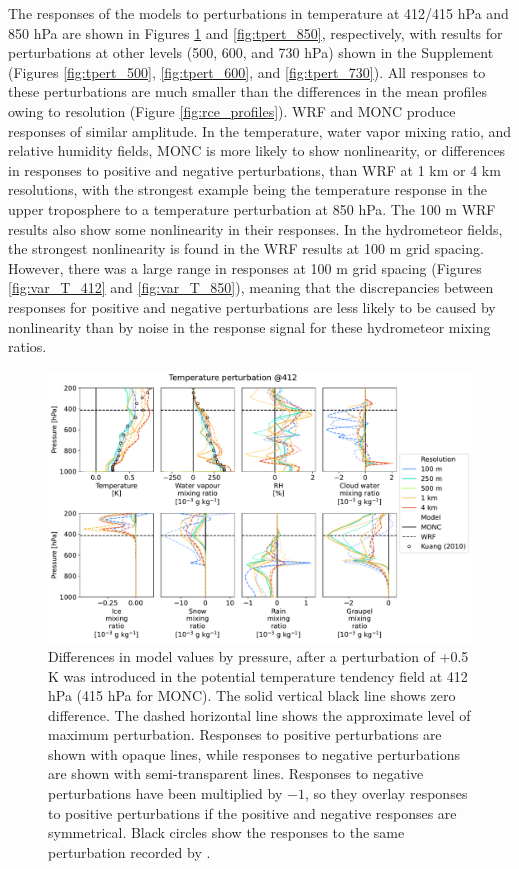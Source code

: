\documentclass[draft]{agujournal2019}
\begin{document}
The responses of the models to perturbations in temperature at 412/415 hPa and
850 hPa are shown in Figures \ref{fig:tpert_412} and \ref{fig:tpert_850},
respectively, with results for perturbations at other levels (500, 600, and 730
hPa) shown in the Supplement (Figures \ref{fig:tpert_500}, \ref{fig:tpert_600},
and \ref{fig:tpert_730}). All responses to these perturbations are much smaller
than the differences in the mean profiles owing to resolution (Figure
\ref{fig:rce_profiles}). WRF and MONC produce responses of similar amplitude. In
the temperature, water vapor mixing ratio, and relative humidity fields, MONC is
more likely to show nonlinearity, or differences in responses to positive and
negative perturbations, than WRF at 1 km or 4 km resolutions, with the strongest
example being the temperature response in the upper troposphere to a temperature
perturbation at 850 hPa. The 100 m WRF results also show some nonlinearity in
their responses. In the hydrometeor fields, the strongest nonlinearity is found
in the WRF results at 100 m grid spacing. However, there was a large range in
responses at 100 m grid spacing (Figures \ref{fig:var_T_412} and
\ref{fig:var_T_850}), meaning that the discrepancies between responses for
positive and negative perturbations are less likely to be caused by nonlinearity
than by noise in the response signal for these hydrometeor mixing ratios.

\begin{figure}[pth]
    \noindent\includegraphics[width=\textwidth]{figures/pert_diffs_T_0.5_@412}
    \caption{Differences in model values by pressure, after a perturbation of
    +0.5 K was introduced in the potential temperature tendency field at 412 hPa
    (415 hPa for MONC). The solid vertical black line shows zero difference. The
    dashed horizontal line shows the approximate level of maximum perturbation.
    Responses to positive perturbations are shown with opaque lines, while
    responses to negative perturbations are shown with semi-transparent lines.
    Responses to negative perturbations have been multiplied by $-1$, so they
    overlay responses to positive perturbations if the positive and negative
    responses are symmetrical. Black circles show the responses to the same
    perturbation recorded by .}
    \label{fig:tpert_412}
\end{figure}
\end{document}
